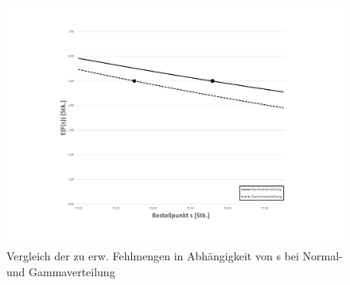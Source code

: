 \begin{figure}
	\centering
	\includegraphics[width=\textwidth,trim=4cm 1.5cm 4cm 1.5cm, clip=true]{./Bilder/VerteilungsfunktionenVerg.pdf}
	\caption{Vergleich der zu erw. Fehlmengen in Abhängigkeit von s bei Normal- und Gammaverteilung}
	\label{img:vergleich}
\end{figure}